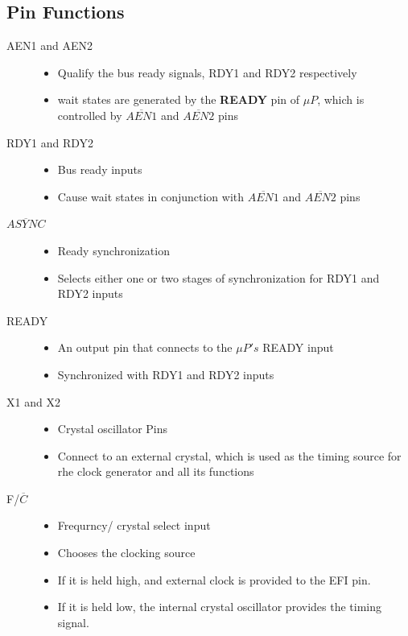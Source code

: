 \subsection{Pin Functions}
\begin{description}

  \item[AEN1 and AEN2]
  \begin{itemize}
    \item Qualify the bus ready signals, RDY1 and RDY2 respectively
    \item wait states are generated by the \textbf{READY} pin of $\mu P$, which is controlled
    by $\overline{AEN1}$ and $\overline{AEN2}$ pins
  \end{itemize}

  \item[RDY1 and RDY2]
  \begin{itemize}
    \item Bus ready inputs
    \item Cause wait states in conjunction with $\overline{AEN1}$ and $\overline{AEN2}$ pins
  \end{itemize}

  \item[$\overline{ASYNC}$]
  \begin{itemize}
    \item Ready synchronization
    \item Selects either one or two stages of synchronization for RDY1 and RDY2 inputs

  \end{itemize}

  \item[READY]
  \begin{itemize}
    \item An output pin that connects to the $\mu P's$ READY input
    \item Synchronized with RDY1 and RDY2 inputs
  \end{itemize}

  \item[X1 and X2]
  \begin{itemize}
    \item Crystal oscillator Pins
    \item Connect to an external crystal, which is used as the timing source for rhe clock generator and all its functions
  \end{itemize}

  \item[F/$\overline{C}$]
  \begin{itemize}
    \item Frequrncy/ crystal select input
    \item Chooses the clocking source
    \item If it is held high, and external clock is provided to the EFI pin.
    \item If it is held low, the internal crystal oscillator provides the timing signal.
  \end{itemize}


\end{description}
